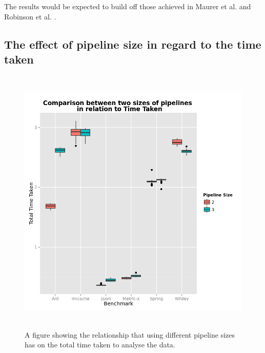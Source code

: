 \documentclass[11pt
              , a4paper
              , twoside
              , openright
              ]{report}
\begin{document}
The results would be expected to build off those achieved in Maurer et al. \cite{li2008static}  and Robinson et al. \cite{koochakzadeh2009test}. 


 \newpage 
 \newpage \begin{appendices}
\chapter{The effect of pipeline size in regard to the time taken}
\begin{figure}[h]
\centering
\includegraphics[width=\textwidth,height=13cm]{PipelineTime.png}
\caption{A figure showing the relationship that using different pipeline sizes has on the total time taken to analyse the data.}
\label{fig:pipelinetime}
\end{figure}


\end{appendices}
\end{document}
